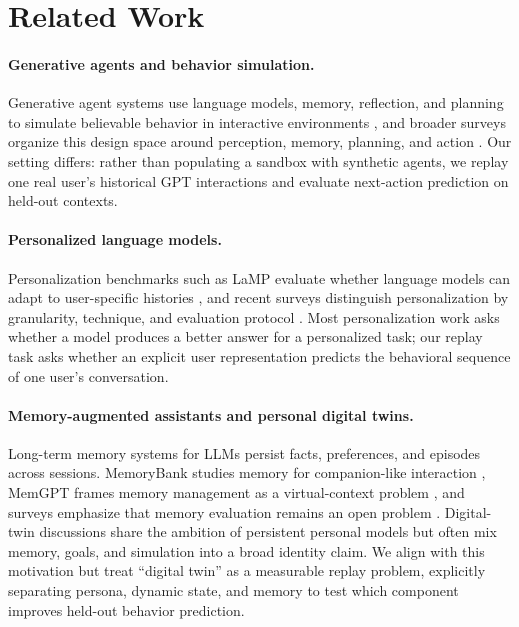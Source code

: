 \section{Related Work}

\paragraph{Generative agents and behavior simulation.}
Generative agent systems use language models, memory, reflection, and planning to simulate believable behavior in interactive environments \cite{park2023generative}, and broader surveys organize this design space around perception, memory, planning, and action \cite{wang2024agentssurvey}. Our setting differs: rather than populating a sandbox with synthetic agents, we replay one real user's historical GPT interactions and evaluate next-action prediction on held-out contexts.

\paragraph{Personalized language models.}
Personalization benchmarks such as LaMP evaluate whether language models can adapt to user-specific histories \cite{salemi2023lamp}, and recent surveys distinguish personalization by granularity, technique, and evaluation protocol \cite{zhang2024personalizationsurvey}. Most personalization work asks whether a model produces a better answer for a personalized task; our replay task asks whether an explicit user representation predicts the behavioral sequence of one user's conversation.

\paragraph{Memory-augmented assistants and personal digital twins.}
Long-term memory systems for LLMs persist facts, preferences, and episodes across sessions. MemoryBank studies memory for companion-like interaction \cite{zhong2023memorybank}, MemGPT frames memory management as a virtual-context problem \cite{packer2023memgpt}, and surveys emphasize that memory evaluation remains an open problem \cite{zhang2024memorysurvey}. Digital-twin discussions share the ambition of persistent personal models but often mix memory, goals, and simulation into a broad identity claim. We align with this motivation but treat ``digital twin'' as a measurable replay problem, explicitly separating persona, dynamic state, and memory to test which component improves held-out behavior prediction.

